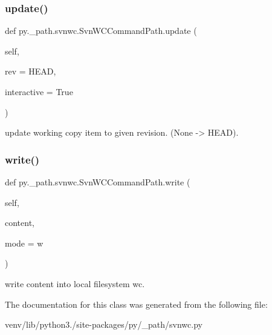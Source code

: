 \subsubsection{\texorpdfstring{update()}{update()}}
{\footnotesize\ttfamily def py.\+\_\+path.\+svnwc.\+Svn\+W\+C\+Command\+Path.\+update (\begin{DoxyParamCaption}\item[{}]{self,  }\item[{}]{rev = {\ttfamily \textquotesingle{}HEAD\textquotesingle{}},  }\item[{}]{interactive = {\ttfamily True} }\end{DoxyParamCaption})}

\begin{DoxyVerb}update working copy item to given revision. (None -> HEAD). \end{DoxyVerb}
 \mbox{\label{classpy_1_1__path_1_1svnwc_1_1_svn_w_c_command_path_a7ec8ca7e5a3273a5845a03e5ad11c3e9}} 
\subsubsection{\texorpdfstring{write()}{write()}}
{\footnotesize\ttfamily def py.\+\_\+path.\+svnwc.\+Svn\+W\+C\+Command\+Path.\+write (\begin{DoxyParamCaption}\item[{}]{self,  }\item[{}]{content,  }\item[{}]{mode = {\ttfamily \textquotesingle{}w\textquotesingle{}} }\end{DoxyParamCaption})}

\begin{DoxyVerb}write content into local filesystem wc. \end{DoxyVerb}
 

The documentation for this class was generated from the following file\+:\begin{DoxyCompactItemize}
\item 
venv/lib/python3./site-\/packages/py/\+\_\+path/svnwc.\+py\end{DoxyCompactItemize}
